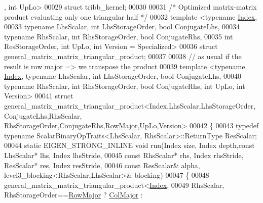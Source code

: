 \begin{DoxyCode}
      , \textcolor{keywordtype}{int} UpLo>
00029 \textcolor{keyword}{struct }tribb\_kernel;
00030   
00031 \textcolor{comment}{/* Optimized matrix-matrix product evaluating only one triangular half */}
00032 \textcolor{keyword}{template} <\textcolor{keyword}{typename} \hyperlink{namespace_eigen_a62e77e0933482dafde8fe197d9a2cfde}{Index},
00033           \textcolor{keyword}{typename} LhsScalar, \textcolor{keywordtype}{int} LhsStorageOrder, \textcolor{keywordtype}{bool} ConjugateLhs,
00034           \textcolor{keyword}{typename} RhsScalar, \textcolor{keywordtype}{int} RhsStorageOrder, \textcolor{keywordtype}{bool} ConjugateRhs,
00035                               \textcolor{keywordtype}{int} ResStorageOrder, \textcolor{keywordtype}{int}  UpLo, \textcolor{keywordtype}{int} Version = Specialized>
00036 \textcolor{keyword}{struct }general\_matrix\_matrix\_triangular\_product;
00037 
00038 \textcolor{comment}{// as usual if the result is row major => we transpose the product}
00039 \textcolor{keyword}{template} <\textcolor{keyword}{typename} \hyperlink{namespace_eigen_a62e77e0933482dafde8fe197d9a2cfde}{Index}, \textcolor{keyword}{typename} LhsScalar, \textcolor{keywordtype}{int} LhsStorageOrder, \textcolor{keywordtype}{bool} ConjugateLhs,
00040                           \textcolor{keyword}{typename} RhsScalar, \textcolor{keywordtype}{int} RhsStorageOrder, \textcolor{keywordtype}{bool} ConjugateRhs, \textcolor{keywordtype}{int}  UpLo, \textcolor{keywordtype}{int} 
      Version>
00041 \textcolor{keyword}{struct }general\_matrix\_matrix\_triangular\_product<Index,LhsScalar,LhsStorageOrder,ConjugateLhs,RhsScalar,
      RhsStorageOrder,ConjugateRhs,\hyperlink{group__enums_ggaacded1a18ae58b0f554751f6cdf9eb13acfcde9cd8677c5f7caf6bd603666aae3}{RowMajor},UpLo,Version>
00042 \{
00043   \textcolor{keyword}{typedef} \textcolor{keyword}{typename} ScalarBinaryOpTraits<LhsScalar, RhsScalar>::ReturnType ResScalar;
00044   \textcolor{keyword}{static} EIGEN\_STRONG\_INLINE \textcolor{keywordtype}{void} run(Index size, Index depth,\textcolor{keyword}{const} LhsScalar* lhs, Index lhsStride,
00045                                       \textcolor{keyword}{const} RhsScalar* rhs, Index rhsStride, ResScalar* res, Index 
      resStride,
00046                                       \textcolor{keyword}{const} ResScalar& alpha, level3\_blocking<RhsScalar,LhsScalar>& 
      blocking)
00047   \{
00048     general\_matrix\_matrix\_triangular\_product<\hyperlink{namespace_eigen_a62e77e0933482dafde8fe197d9a2cfde}{Index},
00049         RhsScalar, RhsStorageOrder==\hyperlink{group__enums_ggaacded1a18ae58b0f554751f6cdf9eb13acfcde9cd8677c5f7caf6bd603666aae3}{RowMajor} ? \hyperlink{group__enums_ggaacded1a18ae58b0f554751f6cdf9eb13a0cbd4bdd0abcfc0224c5fcb5e4f6669a}{ColMajor} : 

\end{DoxyCode}
